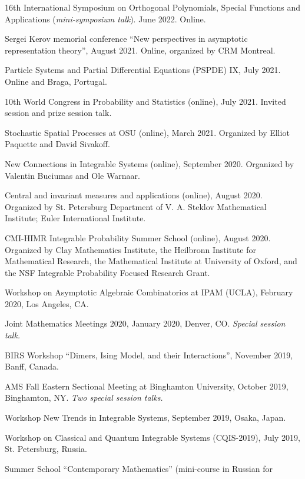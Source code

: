 \documentclass[letterpaper,11pt]{article}
\begin{document}
\begin{etaremune}
\item 
	16th International Symposium on Orthogonal Polynomials, Special Functions and Applications (\emph{mini-symposium talk}).
	June 2022. Online.
\item
	Sergei Kerov memorial conference
	``New perspectives in asymptotic representation theory'',
	August 2021. Online, organized by CRM Montreal.
\item 
	Particle Systems and Partial Differential Equations (PSPDE) IX,
	July 2021. Online and Braga, Portugal.
\item 
	10th World Congress in Probability and Statistics (online),
	July 2021.
	Invited session and prize session talk. 
\item
	Stochastic Spatial Processes at OSU (online),
	March 2021. 
	Organized by Elliot Paquette and David Sivakoff.
\item New Connections in Integrable Systems (online),
	September 2020. 
	Organized by Valentin Buciumas and Ole Warnaar.
\item
	Central and invariant measures and applications (online),
	August 2020.
	Organized by St. Petersburg Department of V. A. Steklov Mathematical Institute; Euler International Institute.
\item
	CMI-HIMR Integrable Probability Summer School (online),
	August 2020.
	Organized by 
	Clay Mathematics Institute, the Heilbronn Institute for Mathematical Research, 
	the Mathematical Institute at University of Oxford, 
	and the NSF Integrable Probability Focused Research Grant.
\item
	Workshop on Asymptotic Algebraic Combinatorics at
	IPAM (UCLA), February 2020,
	Los Angeles, CA.
\item Joint Mathematics Meetings 2020,
	January 2020, 
	Denver, CO. 
	\emph{Special session talk.}
	\item
		BIRS Workshop ``Dimers, Ising Model, and their Interactions'',
		November 2019, Banff, Canada.
	\item AMS Fall Eastern Sectional Meeting
	at 
	Binghamton University, 
	October 2019,
	Binghamton, NY.
	\emph{Two special session talks.}
	\item 
		Workshop New Trends in Integrable Systems, 
		September 2019, Osaka, Japan.
	\item 
		Workshop on Classical and Quantum Integrable
		Systems (CQIS-2019), July 2019, St. Petersburg, Russia.
	\item  
		Summer School ``Contemporary Mathematics'' (mini-course in Russian for 

\end{etaremune}
\end{document}

